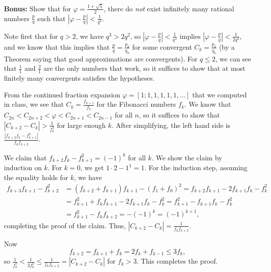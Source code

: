 \documentclass[12pt]{amsart}
\newcommand{\solution}[1]{\ifthenelse {\equal{\displaysol}{1}} {\begin{framed}{\color{meretale}\noindent #1}\end{framed}} { \ }}
\begin{document}
\noindent \textbf{Bonus:} Show that for $\displaystyle\varphi=\frac{1+\sqrt{5}}{2}$, there do \emph{not} exist infinitely many rational numbers $\displaystyle\frac{p}{q}$ such that $\displaystyle \left| \varphi - \frac{p}{q} \right| < \frac{1}{q^3}$.

\solution{Note first that for $q>2$, we have $q^3 > 2q^2$, so $\left| \varphi - \frac{p}{q} \right| < \frac{1}{q^3}$ implies $\left| \varphi - \frac{p}{q} \right| < \frac{1}{2q^2}$, and we know that this implies that $\frac{p}{q} = \frac{p_k}{q_k}$ for some convergent $C_k=\frac{p_k}{q_k}$ (by a Theorem saying that good approximations are convergents). For $q\leq 2$, we can see that $\frac{1}{1}$ and $\frac{2}{1}$ are the only numbers that work, so it suffices to show that at most finitely many convergents satisfies the hypotheses.

From the continued fraction expansion $\varphi=[1;1,1,1,1,1,\dots]$ that we computed in class, we see that $C_k = \frac{f_{k+1}}{f_k}$ for the Fibonacci numbers $f_k$. We know that $C_{2n} < C_{2n+2} < \varphi < C_{2n+1} < C_{2n-1}$ for all $n$, so it suffices to show that $|C_{k+2} - C_k| > \frac{1}{f_k^3}$ for large enough $k$. After simplifying, the left hand side is $\frac{|f_{k+2} f_k - f_{k+1}^2|}{f_k f_{k+2}}$.

We claim that $f_{k+2} f_k - f_{k+1}^2=(-1)^k$ for all $k$. We show the claim by induction on $k$. For $k=0$, we get $1\cdot 2-1^1 = 1$. For the induction step, assuming the equality holds for $k$, we have
\[ \begin{aligned} f_{k+3} f_{k+1} - f_{k+2}^2 &= (f_{k+2} + f_{k+1})f_{k+1} - (f_1+f_0)^2 = f_{k+2} f_{k+1} - 2 f_{k+1}f_k - f_k^2 \\
& = f_{k+1}^2 + f_k f_{k+1} - 2 f_{k+1}f_k - f_k^2 = f_{k+1}^2  -  f_{k+1}f_k - f_k^2 \\
&= f_{k+1}^2 - f_k f_{k+2} = - (-1)^k = (-1)^{k+1},
\end{aligned}\]
completing the proof of the claim. Thus, $|C_{k+2} - C_k| = \frac{1}{f_k f_{k+2}}$.

Now 
\[ f_{k+2} = f_{k+1} + f_k = 2 f_k + f_{k-1} \leq 3f_k,\]
 so $\frac{1}{f_k^3} < \frac{1}{3 f_k^2} \leq \frac{1}{f_k f_{k+2}} = |C_{k+2} - C_k|$ for $f_k>3$. This completes the proof.
}






	
	
\end{document}
